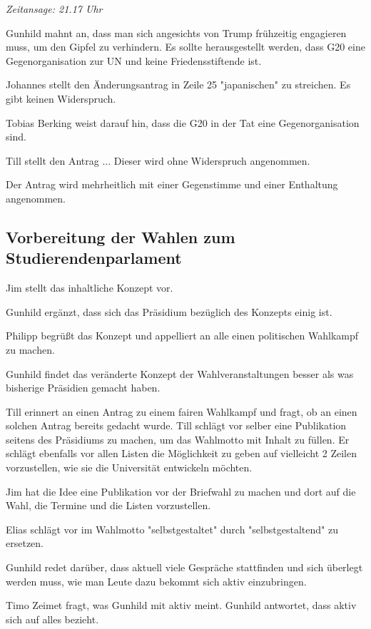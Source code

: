 \documentclass[ngerman,headheight=70pt]{scrartcl}
\begin{document}
    \textit{Zeitansage: 21.17 Uhr}

    Gunhild mahnt an, dass man sich angesichts von Trump frühzeitig engagieren
    muss, um den Gipfel zu verhindern. Es sollte herausgestellt werden, dass
    G20 eine Gegenorganisation zur UN und keine Friedensstiftende ist.

    Johannes stellt den Änderungsantrag in Zeile 25 "japanischen" zu streichen.
    Es gibt keinen Widerspruch.

    Tobias Berking weist darauf hin, dass die G20 in der Tat eine Gegenorganisation
    sind.

    Till stellt den Antrag ...
    Dieser wird ohne Widerspruch angenommen.

    Der Antrag wird mehrheitlich mit einer Gegenstimme und einer Enthaltung angenommen.

    \subsection{Vorbereitung der Wahlen zum Studierendenparlament}

    Jim stellt das inhaltliche Konzept vor.

    Gunhild ergänzt, dass sich das Präsidium bezüglich des Konzepts einig ist.

    Philipp begrüßt das Konzept und appelliert an alle einen politischen Wahlkampf
    zu machen.

    Gunhild findet das veränderte Konzept der Wahlveranstaltungen besser als was
    bisherige Präsidien gemacht haben.

    Till erinnert an einen Antrag zu einem fairen Wahlkampf und fragt, ob an einen
    solchen Antrag bereits gedacht wurde. Till schlägt vor selber eine Publikation
    seitens des Präsidiums zu machen, um das Wahlmotto mit Inhalt zu füllen. Er
    schlägt ebenfalls vor allen Listen die Möglichkeit zu geben auf vielleicht 2
    Zeilen vorzustellen, wie sie die Universität entwickeln möchten.

    Jim hat die Idee eine Publikation vor der Briefwahl zu machen und dort auf
    die Wahl, die Termine und die Listen vorzustellen.

    Elias schlägt vor im Wahlmotto "selbstgestaltet" durch "selbstgestaltend"
    zu ersetzen.

    Gunhild redet darüber, dass aktuell viele Gespräche stattfinden und sich überlegt
    werden muss, wie man Leute dazu bekommt sich aktiv einzubringen.

    Timo Zeimet fragt, was Gunhild mit aktiv meint. Gunhild antwortet, dass aktiv
    sich auf alles bezieht.
\end{document}
